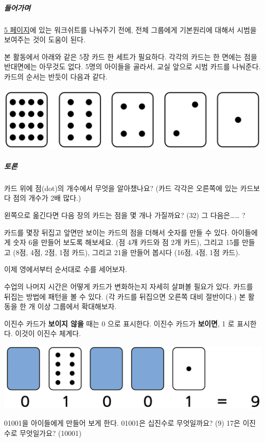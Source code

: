 \documentclass[]{article}
\begin{document}
\subparagraph{들어가며}

\href{05-info-theory.html}{5 페이지}에 있는 워크쉬트를 나눠주기 전에,
전체 그룹에게 기본원리에 대해서 시범을 보여주는 것이 도움이 된다.

본 활동에서 아래와 같은 5장 카드 한 세트가 필요하다. 각각의 카드는 한
면에는 점을 반대면에는 아무것도 없다. 5명의 아이들을 골라서, 교실 앞으로
시범 카드를 나눠준다. 카드의 순서는 반듯이 다음과 같다.

\includegraphics{csunplugged/01-part/img/ch01-binary/01-binary-02-five-cards.png}

\subparagraph{토론}\label{section-10}

카드 위에 점(dot)의 개수에서 무엇을 알아챘나요? (카드 각각은 오른쪽에
있는 카드보다 점의 개수가 2배 많다.)

왼쪽으로 옮긴다면 다음 장의 카드는 점을 몇 개나 가질까요? (32) 그
다음은\ldots{}\ldots{} ?

카드를 몇장 뒤집고 앞면만 보이는 카드의 점을 더해서 숫자를 만들 수 있다.
아이들에게 숫자 6을 만들어 보도록 해보세요. (점 4개 카드와 점 2개 카드),
그리고 15를 만들고 (8점, 4점, 2점, 1점 카드), 그리고 21을 만들어 봅시다
(16점, 4점, 1점 카드).

이제 영에서부터 순서대로 수를 세어보자.

수업의 나머지 시간은 어떻게 카드가 변화하는지 자세히 살펴볼 필요가 있다.
카드를 뒤집는 방법에 패턴을 볼 수 있다. (각 카드를 뒤집으면 오른쪽 대비
절반이다.) 본 활동을 한 개 이상 그룹에서 확대해보자.

이진수 카드가 \textbf{보이지 않을} 때는 0 으로 표시한다. 이진수 카드가
\textbf{보이면}, 1 로 표시한다. 이것이 이진수 체계다.

\includegraphics{csunplugged/01-part/img/ch01-binary/01-binary-03-five-cards-yn.png}

01001을 아이들에게 만들어 보게 한다. 01001은 십진수로 무엇일까요? (9)
17은 이진수로 무엇일가요? (10001)
\end{document}
